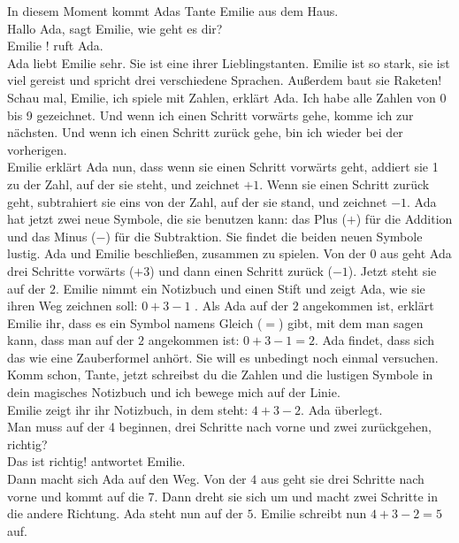 In diesem Moment kommt Adas Tante Emilie aus dem Haus. \\
\frqq{}Hallo Ada\flqq{}, sagt Emilie, \frqq{}wie geht es dir?\flqq{}\\
\frqq{}Emilie !\flqq{} ruft Ada.\\
Ada liebt Emilie sehr. Sie ist eine ihrer Lieblingstanten. Emilie ist so stark, sie ist viel gereist und spricht drei verschiedene Sprachen. Außerdem baut sie Raketen!\\
\frqq{}Schau mal, Emilie, ich spiele mit Zahlen\flqq{}, erklärt Ada. \frqq{}Ich habe alle Zahlen von 0 bis 9 gezeichnet. Und wenn ich einen Schritt vorwärts gehe, komme ich zur nächsten. Und wenn ich einen Schritt zurück gehe, bin ich wieder bei der vorherigen.\flqq{}\\
Emilie erklärt Ada nun, dass wenn sie einen Schritt vorwärts geht, addiert sie 1 zu der Zahl, auf der sie steht, und zeichnet $+1$. Wenn sie einen Schritt zurück geht, subtrahiert sie eins von der Zahl, auf der sie stand, und zeichnet $-1$. Ada hat jetzt zwei neue Symbole, die sie benutzen kann: das Plus ($+$) für die Addition und das Minus ($-$) für die Subtraktion. Sie findet die beiden neuen Symbole lustig. 
Ada und Emilie beschließen, zusammen zu spielen. Von der $0$ aus geht Ada drei Schritte vorwärts ($+3$) und dann einen Schritt zurück ($-1$). Jetzt steht sie auf der $2$. Emilie nimmt ein Notizbuch und einen Stift und zeigt Ada, wie sie ihren Weg zeichnen soll: $0 + 3 - 1$ . Als Ada auf der $2$ angekommen ist, erklärt Emilie ihr, dass es ein Symbol namens Gleich ($=$) gibt, mit dem man sagen kann, dass man auf der $2$ angekommen ist: $0 + 3 - 1 = 2$. Ada findet, dass sich das wie eine Zauberformel anhört. Sie will es unbedingt noch einmal versuchen. \\
\frqq{}Komm schon, Tante, jetzt schreibst du die Zahlen und die lustigen Symbole in dein magisches Notizbuch und ich bewege mich auf der Linie.\flqq{} \\
Emilie zeigt ihr ihr Notizbuch, in dem steht: $4 + 3 - 2$. Ada überlegt. \\
\frqq{}Man muss auf der 4 beginnen, drei Schritte nach vorne und zwei zurückgehen, richtig?\flqq{} \\
\frqq{} Das ist richtig!\flqq{} antwortet Emilie.\\
Dann macht sich Ada auf den Weg. Von der $4$ aus geht sie drei Schritte nach vorne und kommt auf die 7. Dann dreht sie sich um und macht zwei Schritte in die andere Richtung. Ada steht nun auf der $5$. Emilie schreibt nun $4 + 3 - 2 = 5$ auf.\\

